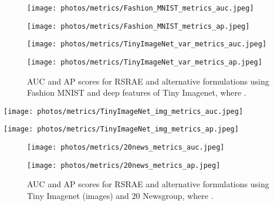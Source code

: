 \documentclass{article} \usepackage{iclr2020_conference,times}
\begin{document}
\begin{figure}[ht]

\centering
\begin{minipage}[t]{0.48\textwidth}
\centering
\texttt{[image: photos/metrics/Fashion\_MNIST\_metrics\_auc.jpeg]}
\end{minipage}
\begin{minipage}[t]{0.48\textwidth}
\centering
\texttt{[image: photos/metrics/Fashion\_MNIST\_metrics\_ap.jpeg]}
\end{minipage}


\centering
\begin{minipage}[t]{0.48\textwidth}
\centering
\texttt{[image: photos/metrics/TinyImageNet\_var\_metrics\_auc.jpeg]}
\end{minipage}
\begin{minipage}[t]{0.48\textwidth}
\centering
\texttt{[image: photos/metrics/TinyImageNet\_var\_metrics\_ap.jpeg]}
\end{minipage}

\caption{AUC and AP scores for RSRAE and alternative formulations using Fashion MNIST and deep features of Tiny Imagenet, where .}
\label{fig:cprrest}
\end{figure}
    
\centering
\begin{minipage}[t]{0.48\textwidth}
\centering
\texttt{[image: photos/metrics/TinyImageNet\_img\_metrics\_auc.jpeg]}
\end{minipage}
\begin{minipage}[t]{0.48\textwidth}
\centering
\texttt{[image: photos/metrics/TinyImageNet\_img\_metrics\_ap.jpeg]}
\end{minipage}




\begin{figure}[ht]

\centering
\begin{minipage}[t]{0.48\textwidth}
\centering
\texttt{[image: photos/metrics/20news\_metrics\_auc.jpeg]}
\end{minipage}
\begin{minipage}[t]{0.48\textwidth}
\centering
\texttt{[image: photos/metrics/20news\_metrics\_ap.jpeg]}
\end{minipage}


\caption{
AUC and AP scores for RSRAE and alternative formulations using Tiny Imagenet (images) and 20 Newsgroup, where .}

\label{fig:cprrest2}

\end{figure}

\vspace{10cm}
\null
\end{document}
